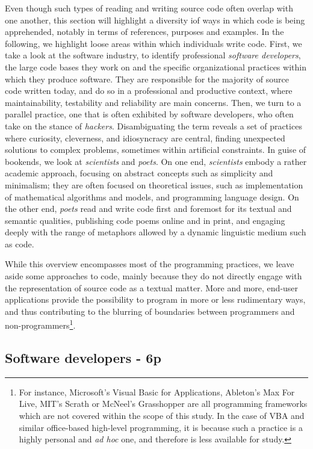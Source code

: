 Even though such types of reading and writing source code often overlap with one another, this section will highlight a diversity iof ways in which code is being apprehended, notably in terms of references, purposes and examples. In the following, we highlight loose areas within which individuals write code. First, we take a look at the software industry, to identify professional \emph{software developers}, the large code bases they work on and the specific organizational practices within which they produce software. They are responsible for the majority of source code written today, and do so in a professional and productive context, where maintainability, testability and reliability are main concerns. Then, we turn to a parallel practice, one that is often exhibited by software developers, who often take on the stance of \emph{hackers}. Disambiguating the term reveals a set of practices where curiosity, cleverness, and idiosyncracy are central, finding unexpected solutions to complex problems, sometimes within artificial constraints. In guise of bookends, we look at \emph{scientists} and \emph{poets}. On one end, \emph{scientists} embody a rather academic approach,  focusing on abstract concepts such as simplicity and minimalism; they are often focused on theoretical issues, such as implementation of mathematical algorithms and models, and programming language design. On the other end, \emph{poets} read and write code first and foremost for its textual and semantic qualities, publishing code poems online and in print, and engaging deeply with the range of metaphors allowed by a dynamic linguistic medium such as code.

While this overview encompasses most of the programming practices, we leave aside some approaches to code, mainly because they do not directly engage with the representation of source code as a textual matter. More and more, end-user applications provide the possibility to program in more or less rudimentary ways, and thus contributing to the blurring of boundaries between programmers and non-programmers\footnote{For instance, Microsoft's Visual Basic for Applications, Ableton's Max For Live, MIT's Scrath or McNeel's Grasshopper are all programming frameworks which are not covered within the scope of this study. In the case of VBA and similar office-based high-level programming, it is because such a practice is a highly personal and \emph{ad hoc} one, and therefore is less available for study.}.

\subsection{Software developers - 6p}

